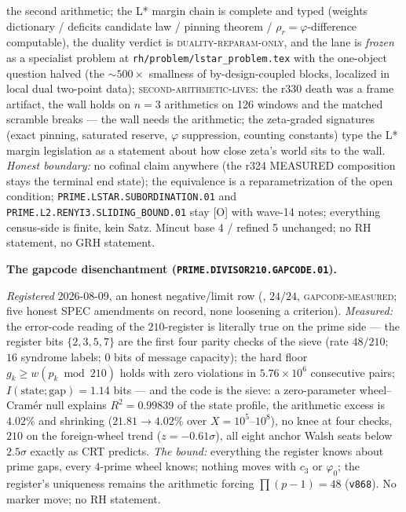 \documentclass[11pt,a4paper]{article}
\begin{document}
{the second arithmetic; the L* margin chain is complete and typed
(weights dictionary / deficits candidate law / pinning theorem /
$\rho_r = \varphi$-difference computable), the duality verdict is
\textsc{duality-reparam-only}, and the lane is \emph{frozen} as a
specialist problem at \texttt{rh/problem/lstar\_problem.tex} with
the one-object question halved (the $\sim500\times$ smallness of
by-design-coupled blocks, localized in local dual two-point data);
\textsc{second-arithmetic-lives}: the r330 death was a frame
artifact, the wall holds on $n = 3$ arithmetics on 126 windows and
the matched scramble breaks --- the wall needs the arithmetic; the
zeta-graded signatures (exact pinning, saturated reserve, $\varphi$
suppression, counting constants) type the L* margin legislation as
a statement about how close zeta's world sits to the wall.
\emph{Honest boundary:} no cofinal claim anywhere (the r324
MEASURED composition stays the terminal end state); the equivalence
is a reparametrization of the open condition;
\texttt{PRIME.LSTAR.\allowbreak SUBORDINATION.01} and
\texttt{PRIME.L2.\allowbreak RENYI3.\allowbreak SLIDING\_BOUND.01}
stay [O] with wave-14 notes; everything census-side is finite,
kein Satz.  Mincut base 4 / refined 5 unchanged; no RH statement,
no GRH statement.\par}

\par\smallskip\noindent\textbf{The gapcode disenchantment
(\texttt{PRIME.DIVISOR210.\allowbreak GAPCODE.01}).}
{\sloppy
\emph{Registered} 2026-08-09, an honest negative/limit row
(, $24/24$,
\textsc{gapcode-measured}; five honest SPEC amendments on
record, none loosening a criterion).  \emph{Measured:} the
error-code reading of the $210$-register is literally true on
the prime side --- the register bits $\{2,3,5,7\}$ are the first
four parity checks of the sieve (rate $48/210$; $16$ syndrome
labels; $0$ bits of message capacity); the hard floor $g_k \ge
w(p_k \bmod 210)$ holds with zero violations in
$5.76\times10^{6}$ consecutive pairs;
$I(\text{state};\text{gap}) = 1.14$ bits --- and the code is the
sieve: a zero-parameter wheel--Cram\'er null explains $R^2 =
0.99839$ of the state profile, the arithmetic excess is $4.02\%$
and shrinking ($21.81 \to 4.02\%$ over $X = 10^5$--$10^8$), no
knee at four checks, $210$ on the foreign-wheel trend ($z =
-0.61\sigma$), all eight anchor Walsh seats below $2.5\sigma$
exactly as CRT predicts.  \emph{The bound:} everything the
register knows about prime gaps, every $4$-prime wheel knows;
nothing moves with $c_3$ or $\varphi_0$; the register's
uniqueness remains the arithmetic forcing $\prod(p-1) = 48$
(\texttt{v868}).  No marker move; no RH statement.\par}
\end{document}
